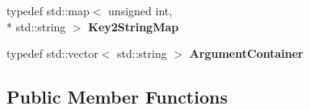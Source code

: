 \begin{DoxyCompactItemize}
\item 
\hypertarget{class_command_line_processing_1_1_argv_parser_aadf3e0f770d7e3ecc9cf0cd0ae0cc117}{typedef std\-::map$<$ unsigned int, \\*
std\-::string $>$ {\bfseries Key2\-String\-Map}}\label{class_command_line_processing_1_1_argv_parser_aadf3e0f770d7e3ecc9cf0cd0ae0cc117}

\item 
\hypertarget{class_command_line_processing_1_1_argv_parser_a66ef6261aaa6f4255e15d342f885d85b}{typedef std\-::vector$<$ std\-::string $>$ {\bfseries Argument\-Container}}\label{class_command_line_processing_1_1_argv_parser_a66ef6261aaa6f4255e15d342f885d85b}

\end{DoxyCompactItemize}
\subsection*{Public Member Functions}
